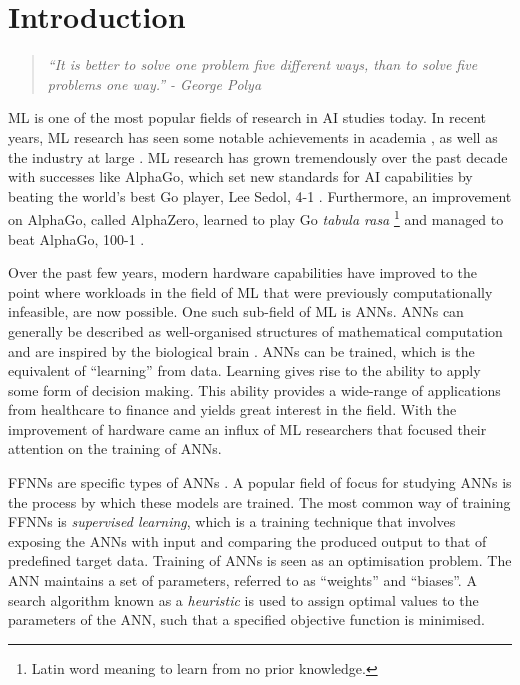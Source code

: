 \chapter{Introduction}\label{chap:introduction}

\begin{quotation}
      \textit{``It is better to solve one problem five different ways, than to solve five problems one way.'' - George Polya}
\end{quotation}


\Ac{ML} is one of the most popular fields of research in \ac{AI} studies today. In recent years, \ac{ML} research has seen some notable achievements in academia \cite{ref:lecun:2015, ref:glorot:2010, ref:goodfellow:2014, ref:quoc:2017}, as well as the industry at large \cite{ref:silver:2016, ref:silver:2017, ref:zoph:2017, ref:lewis:2017}.  \ac{ML} research has grown tremendously over the past decade with successes like AlphaGo, which set new standards for \ac{AI} capabilities by beating the world's best Go player, Lee Sedol, 4-1 \cite{ref:san-hun:2016}.  Furthermore, an improvement on AlphaGo, called AlphaZero, learned to play Go  \textit{tabula rasa} \footnote{Latin word meaning to learn from no prior knowledge.} and managed to beat AlphaGo, 100-1 \cite{ref:silver:2017}.

Over the past few years, modern hardware capabilities have improved to the point where workloads in the field of \ac{ML} that were previously computationally infeasible, are now possible. One such sub-field of \ac{ML} is \acp{ANN}. \acp{ANN} can generally be described as well-organised structures of mathematical computation and are inspired by the biological brain \cite{ref:engelbrecht:2007}. \acp{ANN} can be trained, which is the equivalent of ``learning'' from data. Learning gives rise to the ability to apply some form of decision making. This ability provides a wide-range of applications from healthcare to finance and yields great interest in the field. With the improvement of hardware came an influx of \ac{ML} researchers that focused their attention on the training of \acp{ANN}.

\Acfp{FFNN} are specific types of \acp{ANN} \cite{ref:reed:1999}. A popular field of focus for studying \acp{ANN} is the process by which these models are trained.  The most common way of training \acp{FFNN} is \textit{supervised learning}, which is a training technique that involves exposing the \acp{ANN} with input and comparing the produced output to that of predefined target data. Training of \acp{ANN} is seen as an optimisation problem. The \ac{ANN} maintains a set of parameters, referred to as ``weights'' and ``biases''. A search algorithm known as a \textit{heuristic} \cite{ref:pearl:1984} is used to assign optimal values to the parameters of the \ac{ANN}, such that a specified objective function is minimised.

